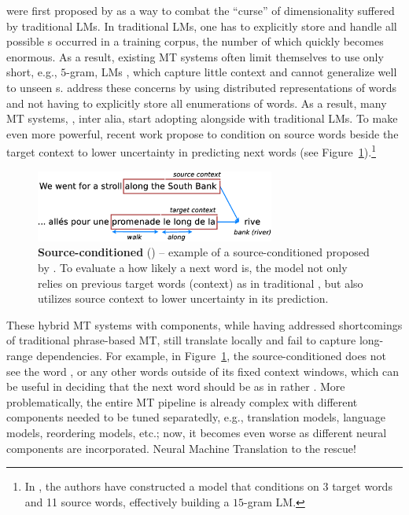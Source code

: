 \nlms{} were first proposed by 
as a way to combat the ``curse'' of dimensionality suffered by traditional LMs.
In traditional LMs, one has to explicitly store and handle 
all possible \ngram{}s occurred in a training corpus, the number of which
quickly becomes enormous. As a result, existing MT systems often limit
themselves to use only short, e.g., $5$-gram, LMs \cite{kenlm}, which capture little context
and cannot generalize well to unseen \ngram{}s. \nlms{} address these concerns by
using distributed representations of words and not having to explicitly store
all enumerations of words. As a result, many MT systems, \cite{schwenk07,vaswani13decode,luong15nlm}, inter
alia, start adopting \nlms{} alongside with traditional LMs.
To make \nlms{} even more powerful, recent work
\cite{Schwenk12continuous,Son:2012:CST,Auli13,devlin14}
propose to condition on source words beside the target context to lower
uncertainty in predicting next words (see Figure~\ref{f:nnjm}).\footnote{In
\cite{devlin14}, the authors have constructed a model that conditions on 3
target words and 11 source words, effectively building a $15$-gram LM.}
\begin{figure}[tbh!]
\centering
\includegraphics[width=0.7\textwidth, clip=true, trim= 0 0 0 0]{img/nnjm.eps} %
\caption[Source-conditioned \nlmtext{}]{{\bf Source-conditioned \nlmtext{}}
(\nlms{}) -- example of a source-conditioned
\nlm{} proposed by . To evaluate a how likely a next word
 is, the model not only relies on previous target words (context)
 as in
traditional \nlms{} \cite{Bengio2003}, but also utilizes source context  to lower uncertainty in its prediction.
} 
\label{f:nnjm}
\end{figure}

These hybrid MT systems with \nlm{} components, while having addressed shortcomings
of traditional phrase-based MT,
still translate locally and fail to capture long-range dependencies. For example, in Figure~\ref{f:nnjm}, the
source-conditioned \nlm{} does not see the word , or any other words
outside of its fixed context windows, which can be useful in deciding that the
next word should be  as in  rather . More problematically, the entire MT pipeline is already complex with
different components needed to be tuned separatedly, e.g., translation models,
language models, reordering models, etc.; now, it becomes even worse as
different neural components are incorporated. Neural Machine Translation to the
rescue!


